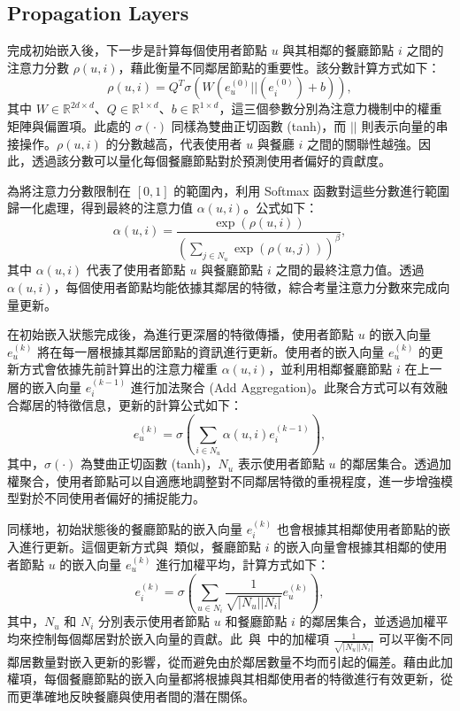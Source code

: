 \subsection{Propagation Layers}
    完成初始嵌入後，下一步是計算每個使用者節點 $u$ 與其相鄰的餐廳節點 $i$ 之間的注意力分數 $\rho(u, i)$，藉此衡量不同鄰居節點的重要性。該分數計算方式如下： 
    \begin{equation} 
        \rho(u, i) = Q^T\sigma(W(e_u^{(0)}||(e_i^{(0)})+b)), 
    \end{equation} 
    其中 $W \in \mathbb{R}^{2d \times d}$、$Q \in \mathbb{R}^{1 \times d}$、$b \in \mathbb{R}^{1 \times d}$，這三個參數分別為注意力機制中的權重矩陣與偏置項。此處的 $\sigma(\cdot)$ 同樣為雙曲正切函數 (tanh)，而 $||$ 則表示向量的串接操作。$\rho(u, i)$ 的分數越高，代表使用者 $u$ 與餐廳 $i$ 之間的關聯性越強。因此，透過該分數可以量化每個餐廳節點對於預測使用者偏好的貢獻度。

    為將注意力分數限制在 $[0,1]$ 的範圍內，利用 Softmax 函數對這些分數進行範圍歸一化處理，得到最終的注意力值 $\alpha(u, i)$。公式如下： \begin{equation} \alpha(u, i) = \frac{\exp(\rho(u, i))}{\left(\sum_{j \in N_u}\exp(\rho(u, j))\right)^{\beta}}, \end{equation} 其中 $\alpha(u, i)$ 代表了使用者節點 $u$ 與餐廳節點 $i$ 之間的最終注意力值。透過~$\alpha(u, i)$，每個使用者節點均能依據其鄰居的特徵，綜合考量注意力分數來完成向量更新。


    在初始嵌入狀態完成後，為進行更深層的特徵傳播，使用者節點 $u$ 的嵌入向量 $e_u^{(k)}$ 將在每一層根據其鄰居節點的資訊進行更新。使用者的嵌入向量 $e_u^{(k)}$ 的更新方式會依據先前計算出的注意力權重 $\alpha(u, i)$，並利用相鄰餐廳節點 $i$ 在上一層的嵌入向量 $e_i^{(k-1)}$ 進行加法聚合 (Add Aggregation)。此聚合方式可以有效融合鄰居的特徵信息，更新的計算公式如下： 
    \begin{equation} 
        e_u^{(k)} = \sigma\left(\sum_{i \in N_u} \alpha(u, i)e_i^{(k-1)}\right), 
    \end{equation} 
    其中，$\sigma(\cdot)$ 為雙曲正切函數 (tanh)，$N_u$ 表示使用者節點 $u$ 的鄰居集合。透過加權聚合，使用者節點可以自適應地調整對不同鄰居特徵的重視程度，進一步增強模型對於不同使用者偏好的捕捉能力。

    同樣地，初始狀態後的餐廳節點的嵌入向量 $e_i^{(k)}$ 也會根據其相鄰使用者節點的嵌入進行更新。這個更新方式與~類似，餐廳節點 $i$ 的嵌入向量會根據其相鄰的使用者節點 $u$ 的嵌入向量 $e_u^{(k)}$ 進行加權平均，計算方式如下： 
    \begin{equation} e_i^{(k)} = \sigma \left(\sum_{u \in N_i} \frac{1}{\sqrt{\vert N_u \vert \vert N_i \vert}} e_u^{(k)}\right), 
        \label{eq-e_i} 
    \end{equation} 其中，$N_u$ 和 $N_i$ 分別表示使用者節點 $u$ 和餐廳節點 $i$ 的鄰居集合，並透過加權平均來控制每個鄰居對於嵌入向量的貢獻。此~與~中的加權項 $\frac{1}{\sqrt{\vert N_u \vert \vert N_i \vert}}$ 可以平衡不同鄰居數量對嵌入更新的影響，從而避免由於鄰居數量不均而引起的偏差。藉由此加權項，每個餐廳節點的嵌入向量都將根據與其相鄰使用者的特徵進行有效更新，從而更準確地反映餐廳與使用者間的潛在關係。

